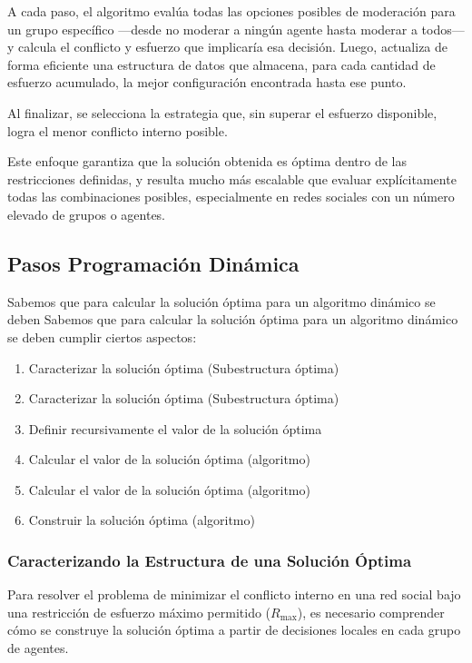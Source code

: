 \documentclass[11pt,letter]{article}
\begin{document}
A cada paso, el algoritmo evalúa todas las opciones posibles de moderación para un grupo específico —desde no moderar a ningún agente hasta moderar a todos— y calcula el conflicto y esfuerzo que implicaría esa decisión. Luego, actualiza de forma eficiente una estructura de datos que almacena, para cada cantidad de esfuerzo acumulado, la mejor configuración encontrada hasta ese punto.

Al finalizar, se selecciona la estrategia que, sin superar el esfuerzo disponible, logra el menor conflicto interno posible.

Este enfoque garantiza que la solución obtenida es óptima dentro de las restricciones definidas, y resulta mucho más escalable que evaluar explícitamente todas las combinaciones posibles, especialmente en redes sociales con un número elevado de grupos o agentes.

\subsection{Pasos Programación Dinámica}
Sabemos que para calcular la solución óptima para un algoritmo dinámico se deben
Sabemos que para calcular la solución óptima para un algoritmo dinámico se deben
cumplir ciertos aspectos:
\begin{enumerate}
    \item Caracterizar la solución óptima (Subestructura óptima)
    \item Caracterizar la solución óptima (Subestructura óptima)
    \item Definir recursivamente el valor de la solución óptima
    \item Calcular el valor de la solución óptima (algoritmo)
    \item Calcular el valor de la solución óptima (algoritmo)
    \item Construir la solución óptima (algoritmo)
\end{enumerate}

\subsubsection{Caracterizando la Estructura de una Solución Óptima}

Para resolver el problema de minimizar el conflicto interno en una red social bajo una restricción de esfuerzo máximo permitido ($R_{\text{max}}$), es necesario comprender cómo se construye la solución óptima a partir de decisiones locales en cada grupo de agentes.
\end{document}
